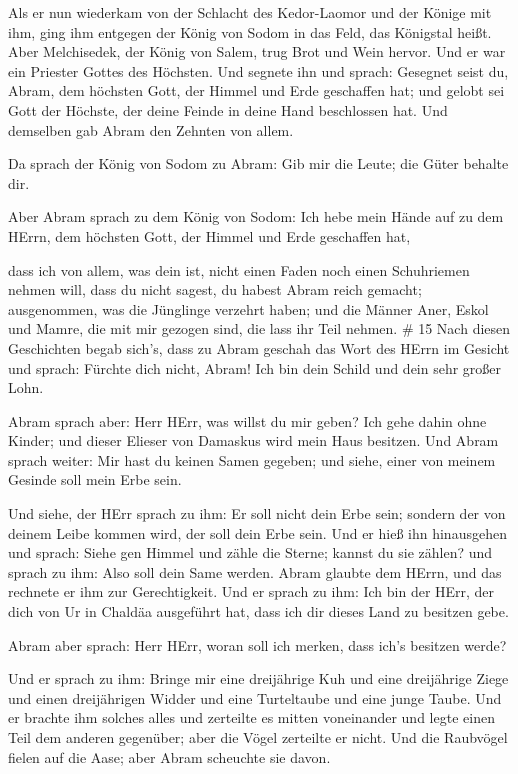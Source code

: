  Als er nun wiederkam von der Schlacht des Kedor-Laomor und
der Könige mit ihm, ging ihm entgegen der König von Sodom in das Feld,
das Königstal heißt.  Aber Melchisedek, der König von
Salem, trug Brot und Wein hervor. Und er war ein Priester Gottes des
Höchsten.  Und segnete ihn und sprach: Gesegnet seist du,
Abram, dem höchsten Gott, der Himmel und Erde geschaffen hat;
 und gelobt sei Gott der Höchste, der deine Feinde in deine
Hand beschlossen hat. Und demselben gab Abram den Zehnten von allem.

 Da sprach der König von Sodom zu Abram: Gib mir die Leute;
die Güter behalte dir.

 Aber Abram sprach zu dem König von Sodom: Ich hebe mein
Hände auf zu dem HErrn, dem höchsten Gott, der Himmel und Erde
geschaffen hat,

 dass ich von allem, was dein ist, nicht einen Faden noch
einen Schuhriemen nehmen will, dass du nicht sagest, du habest Abram
reich gemacht;  ausgenommen, was die Jünglinge verzehrt
haben; und die Männer Aner, Eskol und Mamre, die mit mir gezogen sind,
die lass ihr Teil nehmen. \# 15  Nach diesen Geschichten
begab sich's, dass zu Abram geschah das Wort des HErrn im Gesicht und
sprach: Fürchte dich nicht, Abram! Ich bin dein Schild und dein sehr
großer Lohn.

 Abram sprach aber: Herr HErr, was willst du mir geben? Ich
gehe dahin ohne Kinder; und dieser Elieser von Damaskus wird mein Haus
besitzen.  Und Abram sprach weiter: Mir hast du keinen Samen
gegeben; und siehe, einer von meinem Gesinde soll mein Erbe sein.

 Und siehe, der HErr sprach zu ihm: Er soll nicht dein Erbe
sein; sondern der von deinem Leibe kommen wird, der soll dein Erbe sein.
 Und er hieß ihn hinausgehen und sprach: Siehe gen Himmel
und zähle die Sterne; kannst du sie zählen? und sprach zu ihm: Also soll
dein Same werden.  Abram glaubte dem HErrn, und das rechnete
er ihm zur Gerechtigkeit.  Und er sprach zu ihm: Ich bin der
HErr, der dich von Ur in Chaldäa ausgeführt hat, dass ich dir dieses
Land zu besitzen gebe.

 Abram aber sprach: Herr HErr, woran soll ich merken, dass
ich's besitzen werde?

 Und er sprach zu ihm: Bringe mir eine dreijährige Kuh und
eine dreijährige Ziege und einen dreijährigen Widder und eine
Turteltaube und eine junge Taube.  Und er brachte ihm
solches alles und zerteilte es mitten voneinander und legte einen Teil
dem anderen gegenüber; aber die Vögel zerteilte er nicht. 
Und die Raubvögel fielen auf die Aase; aber Abram scheuchte sie davon.

